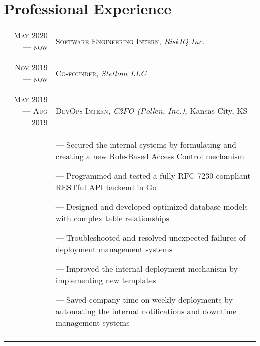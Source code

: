 \documentclass[a4paper,10pt]{article}
\begin{document}
\section{Professional Experience}
\begin{tabular}{r|p{11cm}}

	\textsc{May 2020 --- now}      & \textsc{Software Engineering Intern}, \emph{RiskIQ Inc.}                                                                \\&\footnotesize{
	}                                                                                                                                                        \\\multicolumn{2}{c}{}\\

	\textsc{Nov 2019 --- now}      & \textsc{Co-founder}, \emph{Stellom LLC}                                                                                 \\&\footnotesize{
	}                                                                                                                                                        \\\multicolumn{2}{c}{}\\

	\textsc{May 2019 --- Aug 2019} & \textsc{DevOps Intern}, \emph{C2FO (Pollen, Inc.)}, Kansas-City, KS                                                     \\&\footnotesize{
		--- Secured the internal systems by formulating and creating a new Role-Based Access Control mechanism

		--- Programmed and tested a fully RFC 7230 compliant RESTful API backend in Go

		--- Designed and developed optimized database models with complex table relationships

		--- Troubleshooted and resolved unexpected failures of deployment management systems

		--- Improved the internal deployment mechanism by implementing new templates

		--- Saved company time on weekly deployments by automating the internal notifications and downtime management systems
	}                                                                                                                                                        \\\multicolumn{2}{c}{}\\


\end{tabular}
\end{document}
